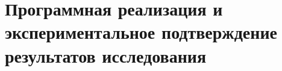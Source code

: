 \chapter{Программная реализация и экспериментальное подтверждение результатов исследования}\label{ch:ch3}
